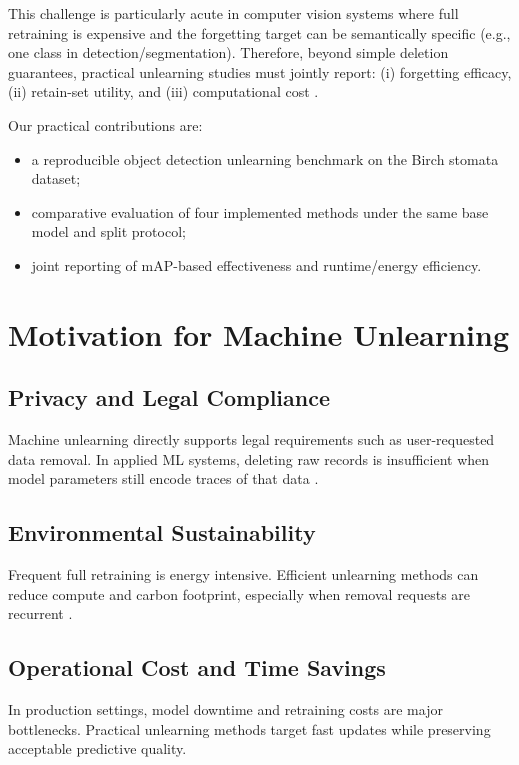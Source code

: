 \documentclass[conference]{IEEEtran}
\begin{document}
This challenge is particularly acute in computer vision systems where full retraining is expensive and the forgetting target can be semantically specific (e.g., one class in detection/segmentation). Therefore, beyond simple deletion guarantees, practical unlearning studies must jointly report: (i) forgetting efficacy, (ii) retain-set utility, and (iii) computational cost \cite{kurmanji2023,strubell2019}.

Our practical contributions are:
\begin{itemize}
    \item a reproducible object detection unlearning benchmark on the Birch stomata dataset;
    \item comparative evaluation of four implemented methods under the same base model and split protocol;
    \item joint reporting of mAP-based effectiveness and runtime/energy efficiency.
\end{itemize}

\section{\textbf{Motivation for Machine Unlearning}}

\subsection{Privacy and Legal Compliance}
Machine unlearning directly supports legal requirements such as user-requested data removal. In applied ML systems, deleting raw records is insufficient when model parameters still encode traces of that data \cite{cao2015,bourtoule2021}.

\subsection{Environmental Sustainability}
Frequent full retraining is energy intensive. Efficient unlearning methods can reduce compute and carbon footprint, especially when removal requests are recurrent \cite{strubell2019}.

\subsection{Operational Cost and Time Savings}
In production settings, model downtime and retraining costs are major bottlenecks. Practical unlearning methods target fast updates while preserving acceptable predictive quality.
\end{document}
